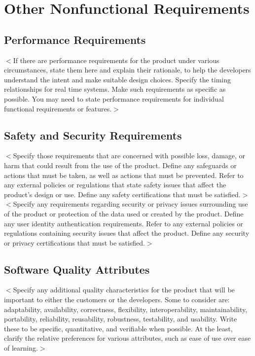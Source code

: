 \documentclass[16pt]{scrreprt}
\begin{document}
\chapter{Other Nonfunctional Requirements}
\label{Other Nonfunctional Requirements}
\section{Performance Requirements}
$<$If there are performance requirements for the product under various 
circumstances, state them here and explain their rationale, to help the 
developers understand the intent and make suitable design choices. Specify the 
timing relationships for real time systems. Make such requirements as specific 
as possible. You may need to state performance requirements for individual 
functional requirements or features.$>$

\section{Safety and Security Requirements}
$<$Specify those requirements that are concerned with possible loss, damage, or 
harm that could result from the use of the product. Define any safeguards or 
actions that must be taken, as well as actions that must be prevented. Refer to 
any external policies or regulations that state safety issues that affect the 
product’s design or use. Define any safety certifications that must be 
satisfied.$>$
$<$Specify any requirements regarding security or privacy issues surrounding use 
of the product or protection of the data used or created by the product. Define 
any user identity authentication requirements. Refer to any external policies or 
regulations containing security issues that affect the product. Define any 
security or privacy certifications that must be satisfied.$>$

\section{Software Quality Attributes}
$<$Specify any additional quality characteristics for the product that will be 
important to either the customers or the developers. Some to consider are: 
adaptability, availability, correctness, flexibility, interoperability, 
maintainability, portability, reliability, reusability, robustness, testability, 
and usability. Write these to be specific, quantitative, and verifiable when 
possible. At the least, clarify the relative preferences for various attributes, 
such as ease of use over ease of learning.$>$
\end{document}
